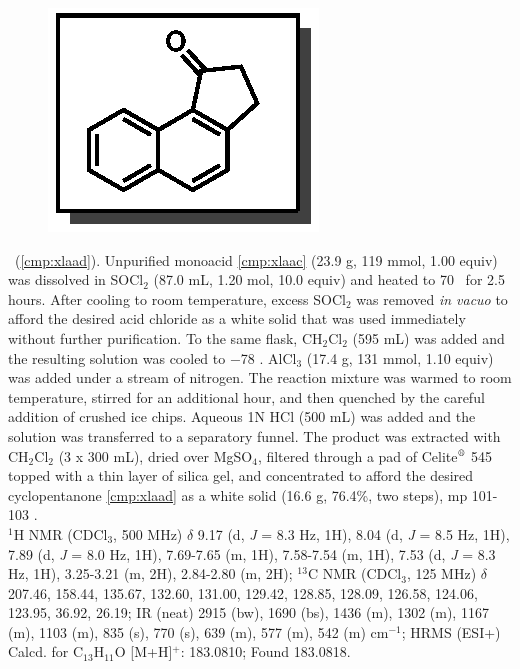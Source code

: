 \vspace{10pt}
\begin{figure}
  \vspace{-15pt}
  \begin{center}
    \includegraphics[scale=0.8]{chp_asymmetric/images/xlaad}
  \end{center}
  \vspace{-30pt}
\end{figure}
\noindent \textbf{\CMPxlaad}\ (\ref{cmp:xlaad}). Unpurified monoacid
\ref{cmp:xlaac} (23.9 g, 119 mmol, 1.00 equiv) was dissolved in
SOCl$_2$ (87.0 mL, 1.20 mol, 10.0 equiv) and heated to 70 \degc\  for 2.5 hours. After cooling to room temperature, excess SOCl$_2$ was removed \textit{in vacuo} to afford the desired acid chloride as a white solid that was used immediately without
further purification. To the same flask, CH$_2$Cl$_2$ (595 mL) was added
and the resulting solution was cooled to $-$78 \degc. AlCl$_3$ (17.4 g, 131
mmol, 1.10 equiv) was added under a stream of nitrogen. The reaction mixture was warmed to room
temperature, stirred for an additional hour, and then quenched by the careful
addition of crushed ice chips. Aqueous 1N HCl (500 mL) was added and the solution was transferred to a separatory funnel. The product was extracted with CH$_2$Cl$_2$ (3 x 300 mL),
dried over MgSO$_4$, filtered through a pad of
Celite$\textsuperscript{\textregistered}$ 545 topped with a thin layer of silica
gel, and concentrated to afford the desired cyclopentanone \ref{cmp:xlaad} as a
white solid (16.6 g, 76.4\%, two steps), mp 101-103 \degc. \\
$^1$H NMR (CDCl$_3$, 500 MHz) $\delta$ 9.17 (d, \textit{J} = 8.3 Hz, 1H), 8.04
(d, \textit{J} = 8.5 Hz, 1H), 7.89 (d, \textit{J} = 8.0 Hz, 1H), 7.69-7.65 (m,
1H), 7.58-7.54 (m, 1H), 7.53 (d, \textit{J} = 8.3 Hz, 1H), 3.25-3.21 (m, 2H),
2.84-2.80 (m, 2H); $^{13}$C NMR (CDCl$_3$, 125 MHz) $\delta$ 207.46, 158.44,
135.67, 132.60, 131.00, 129.42, 128.85, 128.09, 126.58, 124.06, 123.95, 36.92,
26.19; IR (neat) 2915 (bw), 1690 (bs), 1436 (m), 1302 (m), 1167 (m), 1103 (m),
835 (s), 770 (s), 639 (m), 577 (m), 542 (m) cm$^{-1}$; HRMS (ESI+) Calcd. for
C$_{13}$H$_{11}$O [M+H]$^+$: 183.0810; Found 183.0818.

